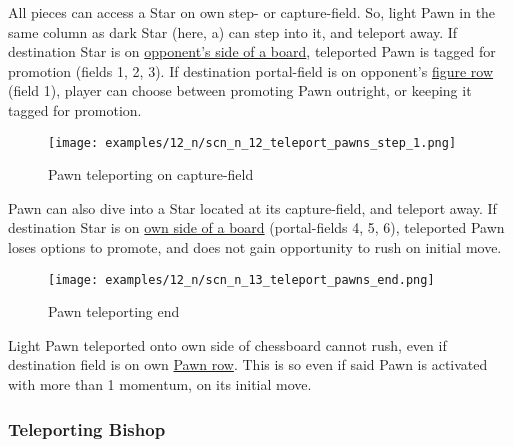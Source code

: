 All pieces can access a Star on own step- or capture-field. So, light Pawn in
the same column as dark Star (here, a) can step into it, and teleport away. If
destination Star is on
\hyperref[sec:Definitions/Chessboard sides, navigation]{opponent's side of a board},
teleported Pawn is tagged for
promotion (fields 1, 2, 3). If destination portal-field is on opponent's
\hyperref[sec:Terms/Figure row]{figure row} (field 1), player can choose between
promoting Pawn outright, or keeping it tagged for promotion.

\clearpage %

\vspace*{-2.0\baselineskip}
\noindent
\begin{figure}[!h]
\texttt{[image: examples/12\_n/scn\_n\_12\_teleport\_pawns\_step\_1.png]}
\caption{Pawn teleporting on capture-field}
\label{fig:scn_n_12_teleport_pawns_step_1}
\end{figure}

Pawn can also dive into a Star located at its capture-field, and teleport away.
If destination Star is on
\hyperref[sec:Definitions/Chessboard sides, navigation]{own side of a board} (portal-fields
4, 5, 6), teleported Pawn loses options to promote, and does not gain opportunity
to rush on initial move.

\clearpage %

\vspace*{-2.0\baselineskip}
\noindent
\begin{figure}[!h]
\texttt{[image: examples/12\_n/scn\_n\_13\_teleport\_pawns\_end.png]}
\caption{Pawn teleporting end}
\label{fig:scn_n_13_teleport_pawns_end}
\end{figure}

Light Pawn teleported onto own side of chessboard cannot rush, even if
destination field is on own \hyperref[sec:Terms/Pawn row]{Pawn row}. This
is so even if said Pawn is activated with more than 1 momentum, on its
initial move.

\clearpage %

\subsubsection*{Teleporting Bishop}
\label{sec:Nineteen/Star/Teleporting pieces/Teleporting Bishop}


